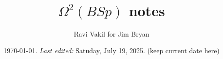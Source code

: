 \newcommand{\aff}{\rm{aff}}

\newcommand{\Gr}{\rm{Gr}}
\newcommand{\LGr}{\rm{LGr}}
\newcommand{\SAG}{\rm{SpAfGr}}
\newcommand{\LSG}{\rm{LgStGr}}

\newcommand{\jalpha}{\mathord{j\mkern-7mu\alpha}}
\newcommand{\vjalpha}{\vec{\jalpha}}



\newcommand{\remind}[1]{{\bf[{\large TODO:  } #1]}}
\newcommand{\lremind}[1]{{\bf[label:  #1]}}
\newcommand{\notation}[1]{}
\renewcommand{\lremind}[1]{{}}

\newcommand{\ravi}[1]{{\bf [#1 --- Ravi]}}
\newcommand{\hidden}[1]{\footnote{Hidden:  #1}}

\newcommand{\cut}[1]{}


\newcommand{\leftbox}[1]{      \begin{flushleft}\fbox{ \parbox{25em}{
#1        }}\end{flushleft}
}\newcommand{\centerbox}[1]{      \begin{center}\fbox{ \parbox{25em}{
#1        }}\end{center}
}
\newcommand{\rightbox}[1]{      \begin{flushright}\fbox{ \parbox{25em}{
#1        }}\end{flushright}
}



\pagestyle{plain}
\title{\Large{$\Omega^2(BSp)$ notes}}
\author{Ravi Vakil for Jim Bryan}
\date{\today .   {\em Last edited:}
 Satuday, July 19, 2025. (keep current date here)  }
\maketitle
\tableofcontents


